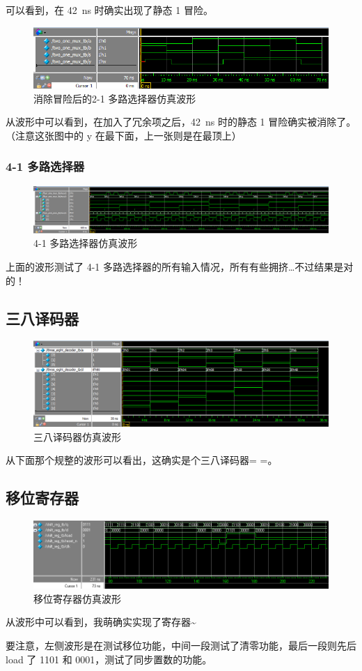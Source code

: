 \documentclass[11pt,a4paper]{article}
\begin{document}
可以看到，在 42~ns 时确实出现了静态 1 冒险。

\begin{figure}[H]
  \centering
    \includegraphics[width=\textwidth]{refined_21mux_wave}
  \caption{消除冒险后的2-1 多路选择器仿真波形}
\end{figure}

从波形中可以看到，在加入了冗余项之后，42~ns 时的静态 1 冒险确实被消除了。（注意这张图中的 y 在最下面，上一张则是在最顶上）

\subsubsection{4-1 多路选择器}
\begin{figure}[H]
  \centering
    \includegraphics[width=\textwidth]{41mux_wave}
  \caption{4-1 多路选择器仿真波形}
\end{figure}
上面的波形测试了 4-1 多路选择器的所有输入情况，所有有些拥挤…不过结果是对的！


\subsection{三八译码器}
\begin{figure}[H]
  \centering
    \includegraphics[width=\textwidth]{38decoder_wave}
  \caption{三八译码器仿真波形}
\end{figure}
从下面那个规整的波形可以看出，这确实是个三八译码器= =。


\subsection{移位寄存器}
\begin{figure}[H]
  \centering
    \includegraphics[width=\textwidth]{shift_reg_wave}
  \caption{移位寄存器仿真波形}
\end{figure}

从波形中可以看到，我萌确实实现了寄存器\textasciitilde

要注意，左侧波形是在测试移位功能，中间一段测试了清零功能，最后一段则先后 load 了 1101 和 0001，测试了同步置数的功能。
\end{document}
